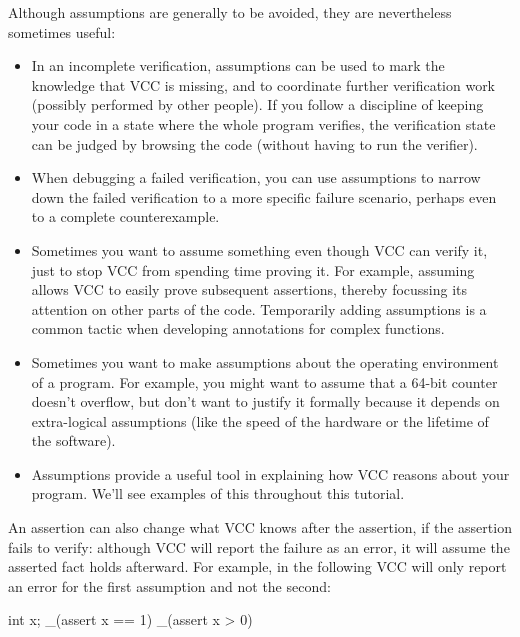 \begin{note}
Although assumptions are generally to be avoided, they are nevertheless
sometimes useful:
\begin{itemize}
\item In an incomplete verification, assumptions can be used to mark
  the knowledge that VCC is missing, and to coordinate further
  verification work (possibly performed by other people). If you
  follow a discipline of keeping your code in a state where the whole 
  program verifies, the verification state can be judged by browsing
  the code (without having to run the verifier).

\item When debugging a failed verification, you can use assumptions to
  narrow down the failed verification to a more specific failure
  scenario, perhaps even to a complete counterexample. 

\item Sometimes you want to assume something even though VCC can
  verify it, just to stop VCC from spending time proving it. For
  example, assuming \vcc{\false} allows VCC to 
  easily prove subsequent assertions, thereby focussing its
  attention on other parts of the code. Temporarily adding assumptions
  is a common tactic when developing annotations for complex functions.

\item Sometimes you want to make assumptions about the operating
  environment of a program. For example, you might want to assume that
  a 64-bit counter doesn't overflow, but don't want to justify it
  formally because it depends on extra-logical assumptions (like the
  speed of the hardware or the lifetime of the software). 

\item Assumptions provide a useful tool in explaining how VCC
  reasons about your program. We'll see examples of this throughout
  this tutorial.
\end{itemize}
\end{note}

An assertion can also change what VCC knows after the assertion, if
the assertion fails to verify: although VCC will report the failure as an error,
it will assume the asserted fact holds afterward. For example, in the following
VCC will only report an error for the first assumption and not the second:
\begin{VCC}
int x;
_(assert x == 1)
_(assert x > 0)
\end{VCC}

